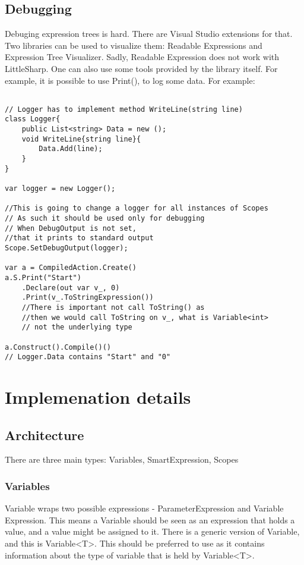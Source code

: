 \subsection{Debugging}
Debuging expression trees is hard. There are Visual Studio extensions for that. Two libraries can be used to visualize them: Readable Expressions and Expression Tree Visualizer. \cite{ExpressDebug} 
Sadly, Readable Expression does not work with LittleSharp. One can also use some tools provided by the library itself. For example, it is possible to use Print(), to log some data. For example:
\begin{lstlisting}

// Logger has to implement method WriteLine(string line)
class Logger{
    public List<string> Data = new ();
    void WriteLine{string line}{
        Data.Add(line);
    }
}

var logger = new Logger();

//This is going to change a logger for all instances of Scopes
// As such it should be used only for debugging
// When DebugOutput is not set, 
//that it prints to standard output
Scope.SetDebugOutput(logger);

var a = CompiledAction.Create()
a.S.Print("Start")
    .Declare(out var v_, 0)
    .Print(v_.ToStringExpression())
    //There is important not call ToString() as 
    //then we would call ToString on v_, what is Variable<int>
    // not the underlying type

a.Construct().Compile()()
// Logger.Data contains "Start" and "0"
\end{lstlisting}


\section{Implemenation details}
\subsection{Architecture}
There are three main types: Variables, SmartExpression, Scopes
\subsubsection{Variables}
Variable wraps two possible expressions - ParameterExpression and Variable Expression. This means a Variable should be seen as an expression that holds a value, and a value might be assigned to it. There is a generic version of Variable, and this is Variable<T>. This should be preferred to use as it contains information about the type of variable that is held by Variable<T>.



